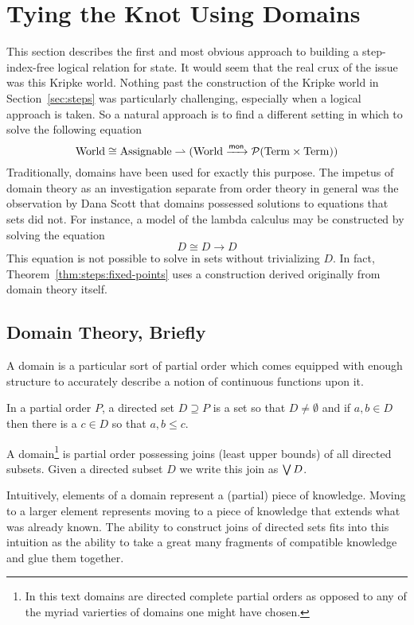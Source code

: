 \section{Tying the Knot Using Domains}\label{sec:domains}

This section describes the first and most obvious approach to building
a step-index-free logical relation for state. It would seem that the
real crux of the issue was this Kripke world. Nothing past the
construction of the Kripke world in Section~\ref{sec:steps}
was particularly challenging, especially when a logical approach is
taken. So a natural approach is to find a different setting in which
to solve the following equation
\[
  \mathrm{World} \cong \mathrm{Assignable} \rightharpoonup (\mathrm{World} \xrightarrow{\mathsf{mon}} \mathcal{P}(\mathrm{Term} \times \mathrm{Term}))
\]
Traditionally, domains have been used for exactly this purpose. The
impetus of domain theory as an investigation separate from order
theory in general was the observation by Dana Scott that domains
possessed solutions to equations that sets did not. For instance, a
model of the lambda calculus may be constructed by solving the
equation
\[
  D \cong D \to D
\]
This equation is not possible to solve in sets without trivializing
$D$. In fact, Theorem~\ref{thm:steps:fixed-points} uses a construction
derived originally from domain theory itself.

\subsection{Domain Theory, Briefly}

A domain is a particular sort of partial order which comes equipped
with enough structure to accurately describe a notion of continuous
functions upon it.
\begin{defn}\label{def:domains:directed-set}
  In a partial order $P$, a directed set $D \supseteq P$ is a set so
  that $D \neq \emptyset$ and if $a, b \in D$ then there is a $c \in
  D$ so that $a, b \le c$.
\end{defn}
\begin{defn}\label{def:domains:domain}
  A domain\footnote{In this text domains are directed complete partial
    orders as opposed to any of the myriad varierties of domains one
    might have chosen.} is partial order possessing joins (least upper
  bounds) of all directed subsets. Given a directed subset $D$ we
  write this join as $\bigvee D$.
\end{defn}
Intuitively, elements of a domain represent a (partial) piece of
knowledge. Moving to a larger element represents moving to a piece of
knowledge that extends what was already known. The ability to
construct joins of directed sets fits into this intuition as the
ability to take a great many fragments of compatible knowledge and
glue them together.

